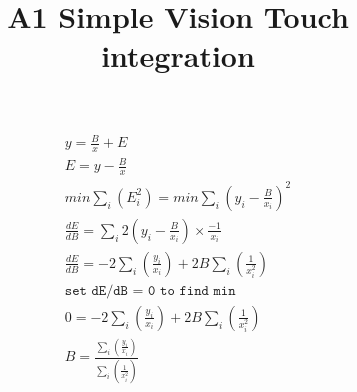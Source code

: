 \documentclass[]{article}
\title{A1 Simple Vision Touch integration}
\author{}
\begin{document}
	\begin{eqnarray}
	y = \frac{B}{x} + E \\
	E = y - \frac{B}{x} \\
	min\sum_{i}(E_i^2) = min \sum_{i}(y_i - \frac{B}{x_i})^2 \\
	\frac{dE}{dB} = \sum_{i}2(y_i-\frac{B}{x_i}) \times \frac{-1}{x_i} \\
	\frac{dE}{dB} = -2\sum_{i}(\frac{y_i}{x_i}) + 2B\sum_{i}(\frac{1}{x_i^2}) \\ 
	\texttt{set dE/dB = 0 to find min} \\
	0 = -2\sum_{i}(\frac{y_i}{x_i}) + 2B\sum_{i}(\frac{1}{x_i^2}) \\
	B = \frac{\sum_{i}(\frac{y_i}{x_i})}{\sum_{i}(\frac{1}{x_i^2})}
	\end{eqnarray}
\end{document}
